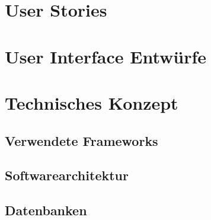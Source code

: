 \documentclass{article}
\begin{document}
\section{User Stories}

\section{User Interface Entwürfe}

\section{Technisches Konzept}

\subsection{Verwendete Frameworks}

\subsection{Softwarearchitektur}

\subsection{Datenbanken}

% 


\end{document}
